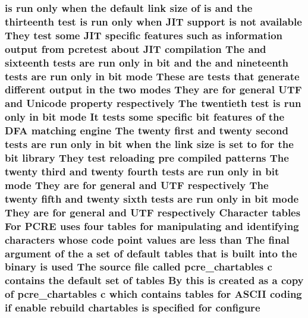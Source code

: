 \subsubsection[{\texorpdfstring{configure}{configure}}]{ {\bf is} {\bf run} only when the {\bf default} link {\bf size} {\bf of} {\bf is} and the thirteenth test {\bf is} {\bf run} only when J\+IT {\bf support} {\bf is} {\bf not} {\bf available} They test some J\+IT specific {\bf features} such {\bf as} information {\bf output} {\bf from} {\bf pcretest} about J\+IT {\bf compilation} The and sixteenth {\bf tests} {\bf are} {\bf run} only {\bf in} {\bf bit} and the and nineteenth {\bf tests} {\bf are} {\bf run} only {\bf in} {\bf bit} {\bf mode} These {\bf are} {\bf tests} that generate different {\bf output} {\bf in} the two {\bf modes} They {\bf are} for general U\+TF and {\bf Unicode} property {\bf respectively} The twentieth test {\bf is} {\bf run} only {\bf in} {\bf bit} {\bf mode} It {\bf tests} some specific {\bf bit} {\bf features} {\bf of} the D\+FA {\bf matching} engine The twenty {\bf first} and twenty {\bf second} {\bf tests} {\bf are} {\bf run} only {\bf in} {\bf bit} when the link {\bf size} {\bf is} {\bf set} {\bf to} for the {\bf bit} {\bf library} They test reloading pre {\bf compiled} {\bf patterns} The twenty third and twenty fourth {\bf tests} {\bf are} {\bf run} only {\bf in} {\bf bit} {\bf mode} They {\bf are} for general and U\+TF {\bf respectively} The twenty fifth and twenty sixth {\bf tests} {\bf are} {\bf run} only {\bf in} {\bf bit} {\bf mode} They {\bf are} for general and U\+TF {\bf respectively} Character {\bf tables} For {\bf P\+C\+RE} uses four {\bf tables} for manipulating and identifying {\bf characters} whose {\bf code} {\bf point} {\bf values} {\bf are} less {\bf than} The final {\bf argument} {\bf of} the {\bf a} {\bf set} {\bf of} {\bf default} {\bf tables} that {\bf is} {\bf built} into the binary {\bf is} {\bf used} The {\bf source} {\bf file} called pcre\+\_\+chartables {\bf c} {\bf contains} the {\bf default} {\bf set} {\bf of} {\bf tables} By {\bf this} {\bf is} created {\bf as} {\bf a} copy {\bf of} pcre\+\_\+chartables {\bf c} {\bf which} {\bf contains} {\bf tables} for {\bf A\+S\+C\+II} coding {\bf if} enable rebuild {\bf chartables} {\bf is} {\bf specified} for configure}\hypertarget{README_8txt_ac58c740a239d6eb3cdc33ab60b5f0467}{}\label{README_8txt_ac58c740a239d6eb3cdc33ab60b5f0467}
